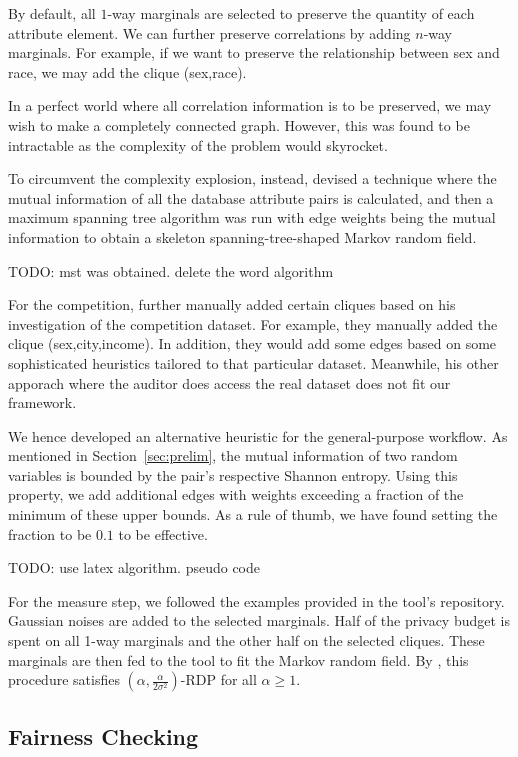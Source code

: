 \documentclass[manuscript,screen,review,anonymous]{acmart}
\begin{document}
By default, all $1$-way marginals are selected to preserve the quantity of each attribute element. We can further preserve correlations by adding $n$-way marginals. For example, if we want to preserve the relationship between sex and race, we may add the clique (sex,race).

In a perfect world where all correlation information is to be preserved, we may wish to make a completely connected graph. However, this was found to be intractable as the complexity of the problem would skyrocket.

To circumvent the complexity explosion, instead, \cite{mckenna2021winning} devised a technique where the mutual information of all the database attribute pairs is calculated, and then a maximum spanning tree algorithm was run with edge weights being the mutual information to obtain a skeleton spanning-tree-shaped Markov random field.

TODO: mst was obtained. delete the word algorithm

For the competition, \cite{mckenna2021winning} further manually added certain cliques based on his investigation of the competition dataset. For example, they manually added the clique (sex,city,income). In addition, they would add some edges based on some sophisticated heuristics tailored to that particular dataset. Meanwhile, his other apporach where the auditor does access the real dataset does not fit our framework.

We hence developed an alternative heuristic for the general-purpose workflow. As mentioned in Section~\ref{sec:prelim}, the mutual information of two random variables is bounded by the pair's respective Shannon entropy. Using this property, we add additional edges with weights exceeding a fraction of the minimum of these upper bounds. As a rule of thumb, we have found setting the fraction to be $0.1$ to be effective.

TODO: use latex algorithm. pseudo code

For the measure step, we followed the examples provided in the tool's repository. Gaussian noises are added to the selected marginals. Half of the privacy budget is spent on all 1-way marginals and the other half on the selected cliques. These marginals are then fed to the tool to fit the Markov random field. By \cite{mckenna2021winning}, this procedure satisfies $(\alpha,\frac{\alpha}{2 \sigma^2})$-RDP for all $\alpha \geq 1$.

\subsection{Fairness Checking}
\end{document}
